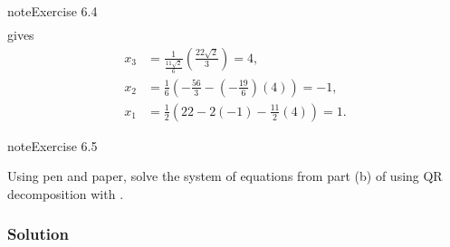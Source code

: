 \documentclass[letterpaper,10pt,english]{jupyterBook}
\begin{document}
\begin{sphinxadmonition}{note}{Exercise 6.4}
\begin{align*}
\end{align*}
\sphinxAtStartPar
gives
\begin{align*}
    x_{3} &= \frac{1}{\frac{11 \sqrt{2}}{6}} (\frac{22 \sqrt{2}}{3}) = 4, \\
    x_{2} &= \frac{1}{6} (- \frac{56}{3} - (- \frac{19}{6})(4)) = -1, \\
    x_{1} &= \frac{1}{2} (22 - 2(-1) - \frac{11}{2}(4)) = 1.
\end{align*}\end{sphinxadmonition}

\begin{sphinxadmonition}{note}{Exercise 6.5}

\sphinxAtStartPar
Using pen and paper, solve the system of equations from part (b) of {\hyperref[\detokenize{6_Direct_methods/6.6_Direct_methods_exercises:ex6-4}]{}} using QR decomposition with {\hyperref[\detokenize{6_Direct_methods/6.4_QR_decomposition:qr-householder-definition}]{}}.
\subsubsection*{Solution}


\end{sphinxadmonition}
\end{document}
